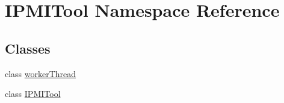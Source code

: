 \hypertarget{namespace_i_p_m_i_tool}{\section{I\-P\-M\-I\-Tool Namespace Reference}
\label{namespace_i_p_m_i_tool}
}
\subsection*{Classes}
\begin{DoxyCompactItemize}
\item 
class \hyperlink{class_i_p_m_i_tool_1_1worker_thread}{worker\-Thread}
\item 
class \hyperlink{class_i_p_m_i_tool_1_1_i_p_m_i_tool}{I\-P\-M\-I\-Tool}
\end{DoxyCompactItemize}
